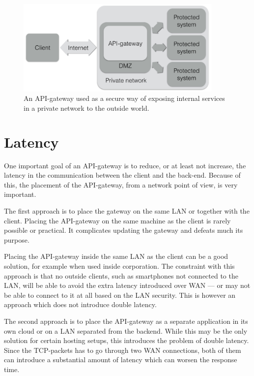 \documentclass{cslthse-msc}
\begin{document}
\begin{figure}[H]
  \centering
    \begin{center}
      \includegraphics[width=0.9\textwidth]{images/api_gateway_dmz.png}
    \end{center}
  \caption{An API-gateway used as a secure way of exposing internal services in a private network to the outside world.}
\end{figure}

\section{Latency}
One important goal of an API-gateway is to reduce, or at least not increase, the latency in the communication between the client and the back-end. Because of this, the placement of the API-gateway, from a network point of view, is very important. 

The first approach is to place the gateway on the same LAN or together with the client. Placing the API-gateway on the same machine as the client is rarely possible or practical. It complicates updating the gateway and defeats much its purpose. 

Placing the API-gateway inside the same LAN as the client can be a good solution, for example when used inside corporation. The constraint with this approach is that no outside clients, such as smartphones not connected to the LAN, will be able to avoid the extra latency introduced over WAN --- or may not be able to connect to it at all based on the LAN security. This is however an approach which does not introduce double latency.

The second approach is to place the API-gateway as a separate application in its own cloud or on a LAN separated from the backend. While this may be the only solution for certain hosting setups, this introduces the problem of double latency. Since the TCP-packets has to go through two WAN connections, both of them can introduce a substantial amount of latency which can worsen the response time.
\end{document}
